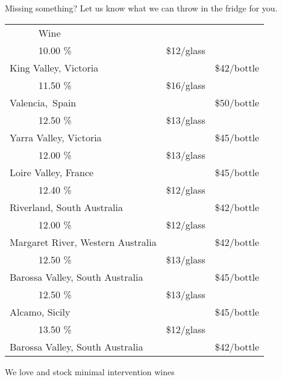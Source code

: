 \documentclass[12pt]{article}
\makeatletter
\newcommand*\ColText[1]{\textcolor{SpringGreen4}{#1}}
\newcommand*\GroupGlassTitle[2]{%
  \noalign{\vspace{2em}}
  \fontfamily{qzc}\selectfont #2 & \vspace{1em}\fontsize{20}{29}\selectfont\ColText{#1}}
\newenvironment{Group}
  {\vspace{2em}\noindent\begin{tabular*}{\textwidth}{@{} p{10mm} l@{\extracolsep{\fill}} r@{\hspace{1em}} r@{}}} %
  {\end{tabular*}}
\newcommand*\Booze[3]{%
  \noalign{\vspace{1em}}
  \multicolumn{2}{l}{ #1 \tiny\dotfill } & \scriptsize #2 \% \tiny\dotfill & \normalsize \$#3}
\newcommand*\Wine[5]{%
  \noalign{\vspace{0.5em}}
  \Booze{#1}{#3}{#4\tiny/glass} \\
  \multicolumn{2}{l}{ \hspace*{0.1em} \scriptsize #2 } & {} & \normalsize \$#5\tiny/bottle}
\newcommand*\Glass[2]{%
    \begin{tikzpicture}[remember picture,overlay]
        \node[xshift=5mm,yshift=0mm]{%
            \texttt{[image: Glasses/\#1.png]}
        };
    \end{tikzpicture}%
}
\newcommand*\GlassWine{%
    \Glass{wine}{4.5mm}}
\makeatother
\begin{document}
\vfill
\begin{center}
	Missing something? Let us know what we can throw in the fridge for you.
\end{center}
\pagebreak
\begin{Group}
    \GroupGlassTitle{Wine}{\GlassWine} \\
    \Wine{Puncheon Darts \textbf{Prosecco}}{King Valley, Victoria}{10.00}{12}{42} \\
    \Wine{Tharsys Cava Brut Nature}{Valencia, Spain}{11.50}{16}{50} \\
    \Wine{Lighthand \textbf{Chardonnay}}{Yarra Valley, Victoria}{12.50}{13}{45} \\
    \Wine{Guy Allion \textbf{Sauvignon Blanc}}{Loire Valley, France}{12.00}{13}{45} \\
    \Wine{Continental Platter Delirium \textbf{Orange}}{Riverland, South Australia}{12.40}{12}{42} \\
    \Wine{Continental Platter \textbf{Rosé}}{Margaret River, Western Australia}{12.00}{12}{42} \\
    \Wine{Quin Everyday Explorer Mataro \textbf{Rosé}}{Barossa Valley, South Australia}{12.50}{13}{45} \\
    \Wine{Ciello Rossa \textbf{Nero d'Avalo}}{Alcamo, Sicily}{12.50}{13}{45} \\
    \Wine{Continental Platter \textbf{Shiraz}}{Barossa Valley, South Australia}{13.50}{12}{42} \\
\end{Group}
\vfill
\begin{center}
	We love and stock minimal intervention wines
\end{center}
\pagebreak
\end{document}
